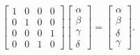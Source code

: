 \documentclass{book}
\theoremstyle{definition}
\theoremstyle{definition}
\theoremstyle{definition}
\theoremstyle{plain}
\theoremstyle{plain}
\theoremstyle{plain}
\theoremstyle{plain}
\begin{document}
\begin{displaymath}
\begin{bmatrix}
1 & 0 & 0 & 0\\
0 & 1 & 0 & 0\\
0 & 0 & 0 & 1\\
0 & 0 & 1 & 0
\end{bmatrix} 
\begin{bmatrix}
\alpha\\
\beta\\
\gamma\\
\delta
\end{bmatrix} = 
\begin{bmatrix}
\alpha\\
\beta\\
\delta\\
\gamma
\end{bmatrix} .
\end{displaymath}
\end{document}
